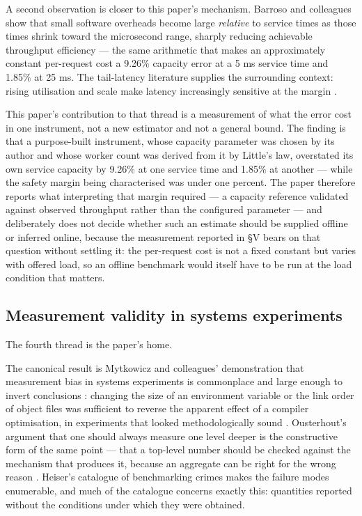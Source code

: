 \documentclass{ieeeaccess}
\begin{document}
A second observation is closer to this paper's mechanism. Barroso and colleagues \cite{killer-microseconds} show that small software overheads become large \textit{relative} to service times as those times shrink toward the microsecond range, sharply reducing achievable throughput efficiency --- the same arithmetic that makes an approximately constant per-request cost a 9.26\% capacity error at a 5 ms service time and 1.85\% at 25 ms. The tail-latency literature supplies the surrounding context: rising utilisation and scale make latency increasingly sensitive at the margin \cite{tail-at-scale}.

This paper's contribution to that thread is a measurement of what the error cost in one instrument, not a new estimator and not a general bound. The finding is that a purpose-built instrument, whose capacity parameter was chosen by its author and whose worker count was derived from it by Little's law, overstated its own service capacity by 9.26\% at one service time and 1.85\% at another --- while the safety margin being characterised was under one percent. The paper therefore reports what interpreting that margin required --- a capacity reference validated against observed throughput rather than the configured parameter --- and deliberately does not decide whether such an estimate should be supplied offline or inferred online, because the measurement reported in \S{}V bears on that question without settling it: the per-request cost is not a fixed constant but varies with offered load, so an offline benchmark would itself have to be run at the load condition that matters.

\subsection{Measurement validity in systems experiments}

The fourth thread is the paper's home.

The canonical result is Mytkowicz and colleagues' demonstration that measurement bias in systems experiments is commonplace and large enough to invert conclusions \cite{papadopoulos}: changing the size of an environment variable or the link order of object files was sufficient to reverse the apparent effect of a compiler optimisation, in experiments that looked methodologically sound \cite{mytkowicz}. Ousterhout's argument that one should always measure one level deeper is the constructive form of the same point --- that a top-level number should be checked against the mechanism that produces it, because an aggregate can be right for the wrong reason \cite{ousterhout}. Heiser's catalogue of benchmarking crimes \cite{heiser} makes the failure modes enumerable, and much of the catalogue concerns exactly this: quantities reported without the conditions under which they were obtained.
\end{document}
